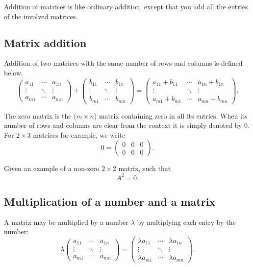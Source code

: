 \documentclass{article}
\begin{document}
Addition of matrices is like ordinary addition, except that you add all the entries of
the involved matrices.

\subsection{Matrix addition}

Addition of two matrices with the same number of rows and columns is defined below.
$$
\begin{pmatrix}
a_{11} & \cdots & a_{1 n} \\
\vdots & \ddots & \vdots\\
a_{m1} & \cdots & a_{m n}
\end{pmatrix} +
\begin{pmatrix}
b_{11} & \cdots& b_{1 n} \\
\vdots & \ddots & \vdots\\
b_{m1} & \cdots & b_{m n}
\end{pmatrix}
=
\begin{pmatrix}
a_{11} + b_{11} & \cdots & a_{1 n} + b_{1n}\\
\vdots & \ddots  & \vdots\\
a_{m1}+b_{m1} & \cdots & a_{m n}+b_{mn}
\end{pmatrix}.
$$

The zero matrix is the ($m\times n$) matrix containing zero in all its entries. When its number of
rows and columns are clear from the context it is simply denoted by $0$. For $2\times 3$ matrices
for example, we write
$$
0 =
\begin{pmatrix}
  0 & 0 & 0\\
  0 & 0 & 0
\end{pmatrix}.
$$


\beginshex
  Given an example of a non-zero $2\times 2$ matrix, such that
  $$
  A^2 = 0.
  $$
\endshex

\subsection{Multiplication of a number and a matrix}

A matrix may be multiplied by a number $\lambda$ by multiplying each entry by the number:
$$
\lambda \begin{pmatrix}
a_{11} & \cdots & a_{1 n} \\
\vdots & \ddots & \vdots\\
a_{m1} & \cdots & a_{m n}
\end{pmatrix} =
\begin{pmatrix}
\lambda a_{11} & \cdots & \lambda a_{1 n} \\
\vdots & \ddots & \vdots\\
\lambda a_{m1} & \cdots & \lambda a_{m n}
\end{pmatrix}.
$$
\end{document}
